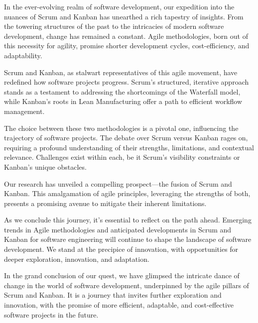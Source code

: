 \documentclass[conference]{IEEEtran}
\begin{document}
In the ever-evolving realm of software development, our expedition into the nuances of Scrum and Kanban has unearthed a rich tapestry of insights. From the towering structures of the past to the intricacies of modern software development, change has remained a constant. Agile methodologies, born out of this necessity for agility, promise shorter development cycles, cost-efficiency, and adaptability.

Scrum and Kanban, as stalwart representatives of this agile movement, have redefined how software projects progress. Scrum's structured, iterative approach stands as a testament to addressing the shortcomings of the Waterfall model, while Kanban's roots in Lean Manufacturing offer a path to efficient workflow management.

The choice between these two methodologies is a pivotal one, influencing the trajectory of software projects. The debate over Scrum versus Kanban rages on, requiring a profound understanding of their strengths, limitations, and contextual relevance. Challenges exist within each, be it Scrum's visibility constraints or Kanban's unique obstacles.

Our research has unveiled a compelling prospect—the fusion of Scrum and Kanban. This amalgamation of agile principles, leveraging the strengths of both, presents a promising avenue to mitigate their inherent limitations.

As we conclude this journey, it's essential to reflect on the path ahead. Emerging trends in Agile methodologies and anticipated developments in Scrum and Kanban for software engineering will continue to shape the landscape of software development. We stand at the precipice of innovation, with opportunities for deeper exploration, innovation, and adaptation.

In the grand conclusion of our quest, we have glimpsed the intricate dance of change in the world of software development, underpinned by the agile pillars of Scrum and Kanban. It is a journey that invites further exploration and innovation, with the promise of more efficient, adaptable, and cost-effective software projects in the future.



 

\end{document}
